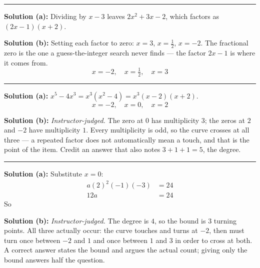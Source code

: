 \documentclass[12pt]{article}
\begin{document}
\vspace{0.1cm}\noindent\rule{\linewidth}{0.2pt}


\textbf{Solution (a):} Dividing by $x - 3$ leaves $2x^{2} + 3x - 2$, which factors as $(2x - 1)(x + 2)$. 

\textbf{Solution (b):} Setting each factor to zero: $x = 3$, $x = \tfrac{1}{2}$, $x = -2$. The fractional zero is the one a guess-the-integer search never finds --- the factor $2x - 1$ is where it comes from.
\[ \boxed{x = -2, \quad x = \tfrac{1}{2}, \quad x = 3} \]

\vspace{0.1cm}\noindent\rule{\linewidth}{0.2pt}


\textbf{Solution (a):} $x^{5} - 4x^{3} = x^{3}\left(x^{2} - 4\right) = x^{3}(x-2)(x+2)$.
\[ \boxed{x = -2, \quad x = 0, \quad x = 2} \]

\textbf{Solution (b):} \emph{Instructor-judged.} The zero at $0$ has multiplicity $3$; the zeros at $2$ and $-2$ have multiplicity $1$. Every multiplicity is odd, so the curve crosses at all three --- a repeated factor does not automatically mean a touch, and that is the point of the item. Credit an answer that also notes $3 + 1 + 1 = 5$, the degree.

\vspace{0.1cm}\noindent\rule{\linewidth}{0.2pt}


\textbf{Solution (a):} Substitute $x = 0$:
\begin{align*}
  a(2)^{2}(-1)(-3) &= 24 \\
  12a &= 24
\end{align*}
So 

\textbf{Solution (b):} \emph{Instructor-judged.} The degree is $4$, so the bound is $3$ turning points. All three actually occur: the curve touches and turns at $-2$, then must turn once between $-2$ and $1$ and once between $1$ and $3$ in order to cross at both. A correct answer states the bound and argues the actual count; giving only the bound answers half the question.
\end{document}
